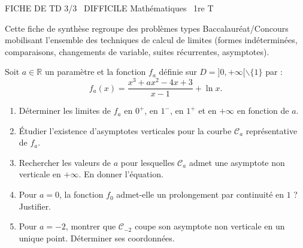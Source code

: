 \documentclass[11pt]{article}
\def\setminus{\mathbin{\backslash}}\let\smallsetminus\setminus
\begin{document}
\begin{tcolorbox}[enhanced,colback=popink,colframe=popink,arc=10pt,boxrule=0pt,left=12pt,right=12pt,top=9pt,bottom=9pt]
{\color{white}\popxbold\small FICHE DE TD 3/3 \textbullet\ DIFFICILE \hfill Mathématiques \textbullet\ 1re T\par}
\end{tcolorbox}
\vspace{4pt}
Cette fiche de synthèse regroupe des problèmes types Baccalauréat/Concours mobilisant l'ensemble des techniques de calcul de limites (formes indéterminées, comparaisons, changements de variable, suites récurrentes, asymptotes).

\begin{exercice}
Soit $a \in \mathbb{R}$ un paramètre et la fonction $f_a$ définie sur $D = ]0, +\infty[ \setminus \{1\}$ par :
\[
f_a(x) = \frac{x^3 + ax^2 - 4x + 3}{x-1} + \ln x.
\]
\begin{enumerate}
    \item Déterminer les limites de $f_a$ en $0^+$, en $1^-$, en $1^+$ et en $+\infty$ en fonction de $a$.
    \item Étudier l'existence d'asymptotes verticales pour la courbe $\mathcal{C}_a$ représentative de $f_a$.
    \item Rechercher les valeurs de $a$ pour lesquelles $\mathcal{C}_a$ admet une asymptote non verticale en $+\infty$. En donner l'équation.
    \item Pour $a = 0$, la fonction $f_0$ admet-elle un prolongement par continuité en $1$ ? Justifier.
    \item Pour $a = -2$, montrer que $\mathcal{C}_{-2}$ coupe son asymptote non verticale en un unique point. Déterminer ses coordonnées.
\end{enumerate}
\end{exercice}
\end{document}
